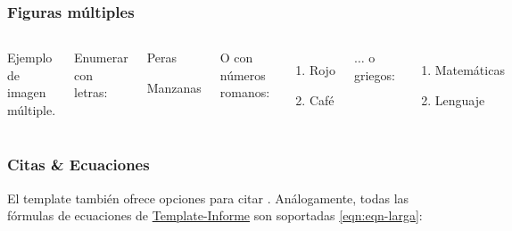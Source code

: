 
\begin{frame}
	\frametitle{Figuras múltiples}
	\begin{columns}[c]
		
		\begin{images}{Ejemplo de imagen múltiple.}
			\imagesnewline
		\end{images}
	
		
		Enumerar con letras:
		
		\begin{enumeratebf}[label=\alph*) ] %
			\item Peras
			\item Manzanas
		\end{enumeratebf}
		
		O con números romanos:
		
		\begin{enumerate}[label=\roman*) ]
			\item Rojo
			\item Café
		\end{enumerate}
	
		$\ldots$ o griegos:
		
		\begin{enumerate}[label=\greek*) ]
			\item Matemáticas
			\item Lenguaje
		\end{enumerate}
	
	\end{columns}
\end{frame}


\begin{frame}
	\frametitle{Citas \& Ecuaciones}
	El template también ofrece opciones para citar \cite{templatelatex}. Análogamente, todas las fórmulas de ecuaciones de \href{https://latex.ppizarror.com/informe}{Template-Informe} son soportadas \eqref{eqn:eqn-larga}:
	
\end{frame}

